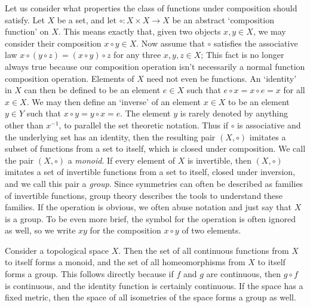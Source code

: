 Let us consider what properties the class of functions under composition should satisfy. Let $X$ be a set, and let $\circ: X \times X \to X$ be an abstract `composition function' on $X$. This means exactly that, given two objects $x,y \in X$, we may consider their composition $x \circ y \in X$. Now assume that $\circ$ satisfies the associative law $x \circ (y \circ z) = (x \circ y) \circ z$ for any three $x,y,z \in X$; This fact is no longer always true because our composition operation isn't necessarily a normal function composition operation. Elements of $X$ need not even be functions. An `identity' in $X$ can then be defined to be an element $e \in X$ such that $e \circ x = x \circ e = x$ for all $x \in X$. We may then define an `inverse' of an element $x \in X$ to be an element $y \in Y$ such that $x \circ y = y \circ x = e$. The element $y$ is rarely denoted by anything other than $x^{-1}$, to parallel the set theoretic notation. Thus if $\circ$ is associative and the underlying set has an identity, then the resulting pair $(X, \circ)$ imitates a subset of functions from a set to itself, which is closed under composition. We call the pair $(X, \circ)$ a \emph{monoid}. If every element of $X$ is invertible, then $(X, \circ)$ imitates a set of invertible functions from a set to itself, closed under inversion, and we call this pair a \emph{group}. Since symmetries can often be described as families of invertible functions, group theory describes the tools to understand these families. If the operation is obvious, we often abuse notation and just say that $X$ is a group. To be even more brief, the symbol for the operation is often ignored as well, so we write $xy$ for the composition $x \circ y$ of two elements.

\begin{example}
    Consider a topological space $X$. Then the set of all continuous functions from $X$ to itself forms a monoid, and the set of all homeomorphisms from $X$ to itself forms a group. This follows directly because if $f$ and $g$ are continuous, then $g \circ f$ is continuous, and the identity function is certainly continuous. If the space has a fixed metric, then the space of all isometries of the space forms a group as well.
\end{example}

